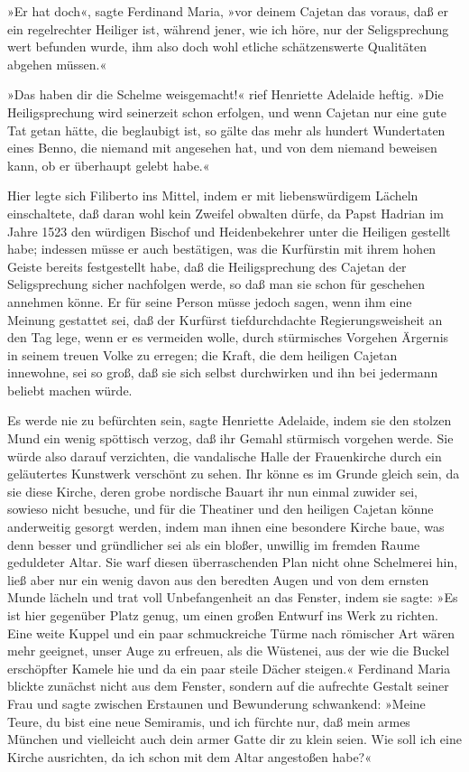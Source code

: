 »Er hat doch«, sagte Ferdinand Maria, »vor deinem Cajetan das
voraus, daß er ein regelrechter Heiliger ist, während jener, wie
ich höre, nur der Seligsprechung wert befunden wurde, ihm also doch
wohl etliche schätzenswerte Qualitäten abgehen müssen.«

»Das haben dir die Schelme weisgemacht!« rief Henriette Adelaide
heftig. »Die Heiligsprechung wird seinerzeit schon\pagenum{[100]}
erfolgen, und wenn Cajetan nur eine gute Tat getan hätte, die
beglaubigt ist, so gälte das mehr als hundert Wundertaten eines
Benno, die niemand mit angesehen hat, und von dem niemand beweisen
kann, ob er überhaupt gelebt habe.«

Hier legte sich Filiberto ins Mittel, indem er mit liebenswürdigem
Lächeln einschaltete, daß daran wohl kein Zweifel obwalten dürfe,
da Papst Hadrian im Jahre 1523 den würdigen Bischof und
Heidenbekehrer unter die Heiligen gestellt habe; indessen müsse er
auch bestätigen, was die Kurfürstin mit ihrem hohen Geiste bereits
festgestellt habe, daß die Heiligsprechung des Cajetan der
Seligsprechung sicher nachfolgen werde, so daß man sie schon für
geschehen annehmen könne. Er für seine Person müsse jedoch sagen,
wenn ihm eine Meinung gestattet sei, daß der Kurfürst
tiefdurchdachte Regierungsweisheit an den Tag lege, wenn er es
vermeiden wolle, durch stürmisches Vorgehen Ärgernis in seinem
treuen Volke zu erregen; die Kraft, die dem heiligen Cajetan
innewohne, sei so groß, daß sie sich selbst durchwirken und ihn bei
jedermann beliebt machen würde.

Es werde nie zu befürchten sein, sagte Henriette Adelaide, indem
sie den stolzen Mund ein wenig spöttisch verzog, daß ihr Gemahl
stürmisch vorgehen werde. Sie würde also darauf verzichten, die
vandalische Halle der Frauenkirche durch ein geläutertes Kunstwerk
verschönt zu sehen. Ihr könne es im Grunde gleich sein, da sie
diese Kirche, deren grobe nordische Bauart ihr nun einmal zuwider
sei, sowieso nicht besuche, und für die Theatiner und den heiligen
Cajetan könne anderweitig gesorgt werden, indem man ihnen eine
besondere Kirche baue, was denn besser und gründlicher sei als ein
bloßer, unwillig im fremden Raume geduldeter Altar. Sie warf diesen
überraschenden Plan nicht ohne\pagenum{[101]} Schelmerei hin, ließ
aber nur ein wenig davon aus den beredten Augen und von dem ernsten
Munde lächeln und trat voll Unbefangenheit an das Fenster, indem
sie sagte: »Es ist hier gegenüber Platz genug, um einen großen
Entwurf ins Werk zu richten. Eine weite Kuppel und ein paar
schmuckreiche Türme nach römischer Art wären mehr geeignet, unser
Auge zu erfreuen, als die Wüstenei, aus der wie die Buckel
erschöpfter Kamele hie und da ein paar steile Dächer steigen.«
Ferdinand Maria blickte zunächst nicht aus dem Fenster, sondern auf
die aufrechte Gestalt seiner Frau und sagte zwischen Erstaunen und
Bewunderung schwankend: »Meine Teure, du bist eine neue Semiramis,
und ich fürchte nur, daß mein armes München und vielleicht auch
dein armer Gatte dir zu klein seien. Wie soll ich eine Kirche
ausrichten, da ich schon mit dem Altar angestoßen habe?«

